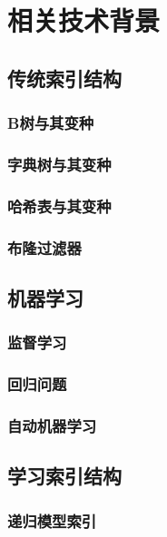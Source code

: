 \chapter{相关技术背景}
\label{chap:back}

\section{传统索引结构}

\subsection{B树与其变种}

\subsection{字典树与其变种}

\subsection{哈希表与其变种}

\subsection{布隆过滤器}

\section{机器学习}

\subsection{监督学习}

\subsection{回归问题}

\subsection{自动机器学习}

\section{学习索引结构}

\subsection{递归模型索引}
